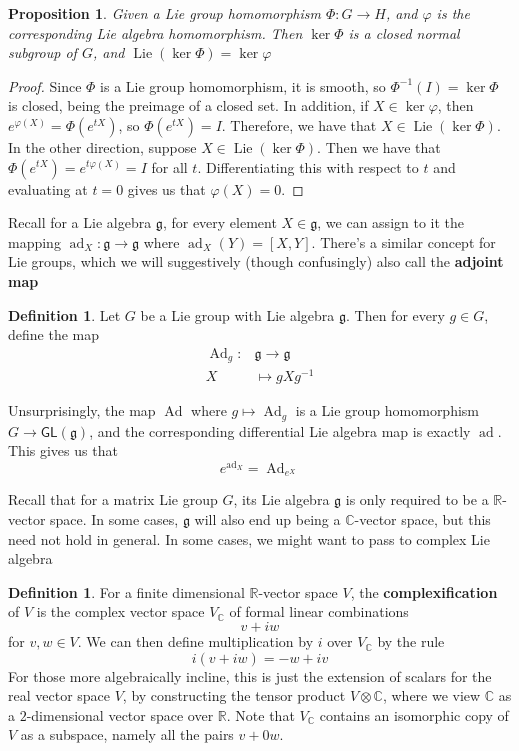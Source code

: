 \documentclass[psamsfonts]{amsart}
\newtheorem{prop}[thm]{Proposition}
\theoremstyle{definition}
\newtheorem{defn}[thm]{Definition}
\theoremstyle{remark}
\newcommand{\R}{\mathbb{R}}
\newcommand{\C}{\mathbb{C}}
\newcommand{\GL}{\mathsf{GL}}
\newcommand{\g}{\mathfrak{g}}
\newcommand{\inv}{^{-1}}
\newcommand{\bra}[2]{ \left[ #1, #2 \right] }
\DeclareMathOperator{\ad}{ad}
\DeclareMathOperator{\Ad}{Ad}
\DeclareMathOperator{\Lie}{Lie}
\begin{document}
\begin{prop}
Given a Lie group homomorphism $\Phi: G\to H$, and $\varphi$ is the corresponding Lie algebra homomorphism. Then $\ker \Phi$ is a closed normal subgroup of $G$, and $\Lie(\ker \Phi) = \ker \varphi$
\end{prop}

\begin{proof}
Since $\Phi$ is a Lie group homomorphism, it is smooth, so $\Phi\inv(I) = \ker \Phi$ is closed, being the preimage of a closed set. In addition, if $X \in \ker \varphi$, then $e^{\varphi(X)} = \Phi(e^{tX})$, so $\Phi(e^{tX}) = I$. Therefore, we have that $X \in \Lie(\ker \Phi)$. In the other direction, suppose $X \in \Lie(\ker \Phi)$. Then we have that $\Phi(e^{tX}) = e^{t\varphi(X)}=I$ for all $t$. Differentiating this with respect to $t$ and evaluating at $t = 0$ gives us that $\varphi(X) = 0$.
\end{proof}

Recall for a Lie algebra $\g$, for every element $X \in \g$, we can assign to it the mapping $\ad_X: \g \to \g$ where $\ad_X(Y) = \bra{X}{Y}$. There's a similar concept for Lie groups, which we will suggestively (though confusingly) also call the \textbf{adjoint map}

\begin{defn}
Let $G$ be a Lie group with Lie algebra $\g$. Then for every $g \in G$, define the map
\begin{align*}
\Ad_g: &\g \to \g \\
X &\mapsto gXg\inv
\end{align*}
\end{defn}
Unsurprisingly, the map $\Ad$ where $g \mapsto \Ad_g$ is a Lie group homomorphism $G \to \GL(\g)$, and the corresponding differential Lie algebra map is exactly $\ad$. This gives us that 
$$e^{\ad_X} = \Ad_{e^X} $$

Recall that for a matrix Lie group $G$, its Lie algebra $\g$ is only required to be a $\R$-vector space. In some cases, $\g$ will also end up being a $\C$-vector space, but this need not hold in general. In some cases, we might want to pass to complex Lie algebra

\begin{defn}
For a finite dimensional $\R$-vector space $V$, the \textbf{complexification} of $V$ is the complex vector space $V_\C$ of formal linear combinations 
$$v + iw $$
for $v,w \in V$. We can then define multiplication by $i$ over $V_\C$ by the rule
$$i(v + iw) = -w + iv$$
For those more algebraically incline, this is just the extension of scalars for the real vector space $V$, by constructing the tensor product $V \otimes \C$, where we view $\C$ as a $2$-dimensional vector space over $\R$. Note that $V_\C$ contains an isomorphic copy of $V$ as a subspace, namely all the pairs $v + 0w$.
\end{defn}
\end{document}
